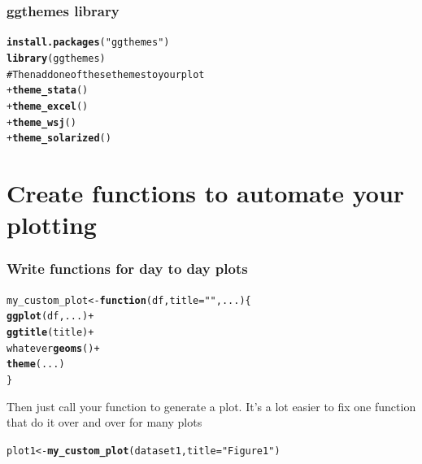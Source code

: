 \documentclass{beamer}\usepackage{graphicx, color}
\makeatletter
\newcommand{\hlfunctioncall}[1]{\textcolor[rgb]{0.501960784313725,0,0.329411764705882}{\textbf{#1}}}%
\newcommand{\hlstring}[1]{\textcolor[rgb]{0.6,0.6,1}{#1}}%
\newcommand{\hlcomment}[1]{\textcolor[rgb]{0.180392156862745,0.6,0.341176470588235}{#1}}%
\newenvironment{kframe}{%
 \def\at@end@of@kframe{}%
 \ifinner\ifhmode%
  \def\at@end@of@kframe{\end{minipage}}%
  \begin{minipage}{\columnwidth}%
 \fi\fi%
 \def\FrameCommand##1{\hskip\@totalleftmargin \hskip-\fboxsep
 \colorbox{shadecolor}{##1}\hskip-\fboxsep
     \hskip-\linewidth \hskip-\@totalleftmargin \hskip\columnwidth}%
 \MakeFramed {\advance\hsize-\width
   \@totalleftmargin\z@ \linewidth\hsize
   \@setminipage}}%
 {\par\unskip\endMakeFramed%
 \at@end@of@kframe}
\newenvironment{knitrout}{}{} %
\makeatother
\begin{document}
\begin{frame}[fragile]
\frametitle{ggthemes library}
\begin{knitrout}\footnotesize
{}\color{fgcolor}\begin{kframe}
\begin{alltt}
\hlfunctioncall{install.packages}(\hlstring{"ggthemes"})
\hlfunctioncall{library}(ggthemes)
\hlcomment{# Then add one of these themes to your plot}
+\hlfunctioncall{theme_stata}()
+\hlfunctioncall{theme_excel}()
+\hlfunctioncall{theme_wsj}()
+\hlfunctioncall{theme_solarized}()
\end{alltt}
\end{kframe}
\end{knitrout}

\end{frame}


\section*{Create functions to automate your plotting}
\frame{\sectionpage}

\begin{frame}[fragile]
\frametitle{Write functions for day to day plots}
\begin{knitrout}\footnotesize
{}\color{fgcolor}\begin{kframe}
\begin{alltt}
my_custom_plot <- \hlfunctioncall{function}(df, title = \hlstring{""}, ...) \{
    \hlfunctioncall{ggplot}(df, ...) +
    \hlfunctioncall{ggtitle}(title) +
    whatever \hlfunctioncall{geoms}() +
    \hlfunctioncall{theme}(...)
\}
\end{alltt}
\end{kframe}
\end{knitrout}


Then just call your function to generate a plot.
It's a lot easier to fix one function that do it over and over for many plots
\begin{knitrout}\footnotesize
{}\color{fgcolor}\begin{kframe}
\begin{alltt}
plot1 <- \hlfunctioncall{my_custom_plot}(dataset1, title = \hlstring{"Figure 1"})
\end{alltt}
\end{kframe}
\end{knitrout}



\end{frame}
\end{document}
